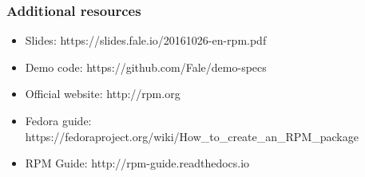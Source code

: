 \documentclass[t,aspectratio=169]{beamer}
\begin{document}
\begin{frame}
    \frametitle{Additional resources}
    \begin{itemize}
        \item Slides: https://slides.fale.io/20161026-en-rpm.pdf
        \item Demo code: https://github.com/Fale/demo-specs
        \item Official website: http://rpm.org
        \item Fedora guide: https://fedoraproject.org/wiki/How\_to\_create\_an\_RPM\_package
        \item RPM Guide: http://rpm-guide.readthedocs.io
    \end{itemize}
\end{frame}

\end{document}
